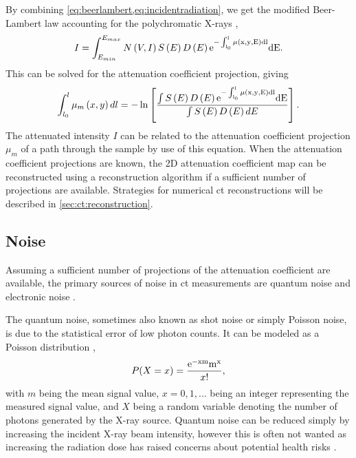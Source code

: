 By combining \cref{eq:beerlambert,eq:incidentradiation}, we get the modified Beer-Lambert law accounting for the polychromatic X-rays \cite{doi:10.1063/1.4950807}, 
\begin{equation}
    I = \int_{E_{min}}^{E_{max}}N\left(V,I\right)S\left(E\right)D\left(E\right)\rm{e}^{-\int_{l_0}^{l}\mu\left(x,y,E\right)dl}dE.
\end{equation}
This can be solved for the attenuation coefficient projection, giving \cite{doi:10.1063/1.4950807}
\begin{equation}
    \label{eq:ctattenuationcoefficient}
    \int_{l_0}^{l} \mu_m\left(x,y\right)dl = -\ln\left[\frac{\int S\left(E\right) D\left(E\right)\rm{e}^{-\int_{l_0}^{l}\mu\left(x,y,E\right)dl} dE }{ \int S\left(E\right) D\left(E\right) dE }\right].
\end{equation}
The attenuated intensity $I$ can be related to the attenuation coefficient projection $\mu_m$ of a path through the sample by use of this equation. When the attenuation coefficient projections are known, the 2D attenuation coefficient map can be reconstructed using a reconstruction algorithm if a sufficient number of projections are available. Strategies for numerical \gls{ct} reconstructions will be described in \cref{sec:ct:reconstruction}.

\subsection{Noise}
\label{sec:ct:theory:noise}
Assuming a sufficient number of projections of the attenuation coefficient are available, the primary sources of noise in \gls{ct} measurements are quantum noise and electronic noise \cite{boas2012ct}. 

The quantum noise, sometimes also known as shot noise or simply Poisson noise, is due to the statistical error of low photon counts. It can be modeled as a Poisson distribution \cite{Whiting2006},
\begin{equation}
    \label{eq:poissonnoise}
    P(X = x) = \frac{\rm{e}^{-xm}m^x}{x!},
\end{equation}
with $m$ being the mean signal value, $x=0,1,...$ being an integer representing the measured signal value, and $X$ being a random variable denoting the number of photons generated by the X-ray source. Quantum noise can be reduced simply by increasing the incident X-ray beam intensity, however this is often not wanted as increasing the radiation dose has raised concerns about potential health risks \cite{doi:10.1056/NEJMra072149,PEARCE2012499}. 


